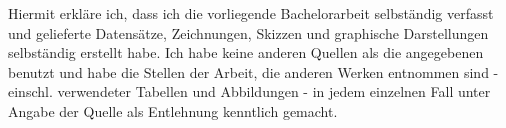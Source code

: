 Hiermit erkläre ich, dass ich die vorliegende Bachelorarbeit selbständig verfasst und
gelieferte Datensätze, Zeichnungen, Skizzen und graphische Darstellungen selbständig
erstellt habe. Ich habe keine anderen Quellen als die angegebenen benutzt und habe
die Stellen der Arbeit, die anderen Werken entnommen sind - einschl. verwendeter
Tabellen und Abbildungen - in jedem einzelnen Fall unter Angabe der Quelle als
Entlehnung kenntlich gemacht.